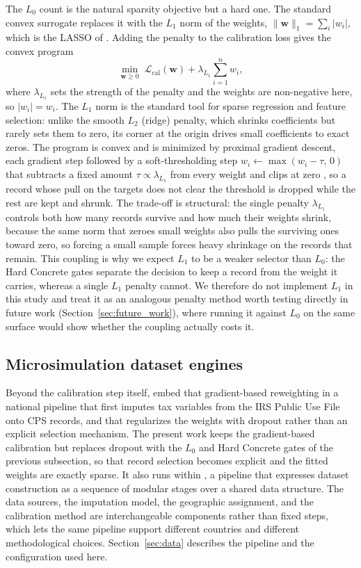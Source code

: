 The $L_0$ count is the natural sparsity objective but a hard one. The standard convex surrogate replaces
it with the $L_1$ norm of the weights, $\lVert \mathbf{w} \rVert_1 = \sum_i |w_i|$, which is the LASSO of
\citet{tibshirani1996}. Adding the penalty to the calibration loss gives the convex program
\begin{equation}
    \min_{\mathbf{w} \ge 0}\; \mathcal{L}_{\mathrm{cal}}(\mathbf{w}) + \lambda_{L_1} \sum_{i=1}^{n} w_i,
    \label{eq:l1}
\end{equation}
where $\lambda_{L_1}$ sets the strength of the penalty and the weights are non-negative here, so
$|w_i| = w_i$. The $L_1$ norm is the standard tool for sparse regression and feature selection: unlike the
smooth $L_2$ (ridge) penalty, which shrinks coefficients but rarely sets them to zero, its corner at the
origin drives small coefficients to exact zeros. The program is convex and is minimized by proximal
gradient descent, each gradient step followed by a soft-thresholding step
$w_i \leftarrow \max(w_i - \tau,\, 0)$ that subtracts a fixed amount $\tau \propto \lambda_{L_1}$ from every
weight and clips at zero \citep{beck2009fista}, so a record whose pull on the targets does not clear the
threshold is dropped while the rest are kept and shrunk. The trade-off is structural: the single penalty
$\lambda_{L_1}$ controls both how many records survive and how much their weights shrink, because the same
norm that zeroes small weights also pulls the surviving ones toward zero, so forcing a small sample forces
heavy shrinkage on the records that remain. This coupling is why we expect $L_1$ to be a weaker selector
than $L_0$: the Hard Concrete gates separate the decision to keep a record from the weight it carries,
whereas a single $L_1$ penalty cannot. We therefore do not implement $L_1$ in this study and treat it as
an analogous penalty method worth testing directly in future work (Section~\ref{sec:future_work}), where
running it against $L_0$ on the same surface would show whether the coupling actually costs it.

\subsection{Microsimulation dataset engines}

Beyond the calibration step itself, \citet{woodruff2024} embed that gradient-based reweighting in a
national pipeline that first imputes tax variables from the IRS Public Use File onto CPS records, and
that regularizes the weights with dropout rather than an explicit selection mechanism. The present
work keeps the gradient-based calibration but replaces dropout with the $L_0$ and Hard Concrete gates
of the previous subsection, so that record selection becomes explicit and the fitted weights are
exactly sparse. It also runs within \microcosm{}, a pipeline that
expresses dataset construction as a sequence of modular stages over a shared data structure. The data
sources, the imputation model, the geographic assignment, and the calibration method are
interchangeable components rather than fixed steps, which lets the same pipeline support different
countries and different methodological choices.
Section~\ref{sec:data} describes the pipeline and the configuration used here.
